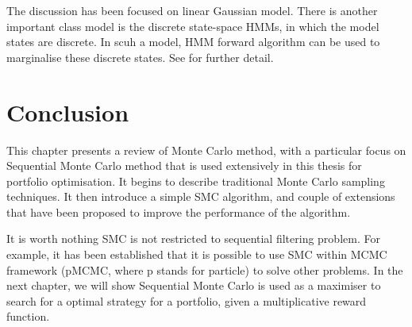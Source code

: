The discussion has been focused on linear Gaussian model. There is another important class model is the discrete state-space HMMs, in which the model states are discrete. In scuh a model, HMM forward algorithm \cite{LRR89} can be used to marginalise these discrete states. See \cite{CO05} for further detail.

\section{Conclusion}
This chapter presents a review of Monte Carlo method, with a particular focus on Sequential Monte Carlo method that is used extensively in this thesis for portfolio optimisation. It begins to describe traditional Monte Carlo sampling techniques. It then introduce a simple SMC algorithm, and couple of extensions that have been proposed to improve the performance of the algorithm.

It is worth nothing SMC is not restricted to sequential filtering problem. For example, it has been established that it is possible to use SMC within MCMC framework (pMCMC, where p stands for particle) \cite{CA10} to solve other problems. In the next chapter, we will show Sequential Monte Carlo is used as a maximiser to search for a optimal strategy for a portfolio, given a multiplicative reward function.








\endinput
\section{Markov chain Monte Carlo (MCMC)}

Markov chain Monte Carlo (MCMC) are a set of algorithms that allows ones to draw random samples from the target probability distribution by constructing a ergotic Markov chain process which has its stationary distribution set to be target desired distribution. 

\subsection{Markov Chain}
Conceptually, Markov chain is a stochastic process in which the past and future states of the process are independent given the current state. A Markov chain can be viewed as an \emph{ordered} sequence of states $\{x_{1:N}\}$, in which state $x_t$ only depends on state $x_{t-1}$, i.e., the state at time $t$ is determined based on some trasition distribution of the form $p(x_t \mid x_{t-1})$, which is independent of all previous states $x_{t-2}, x_{t-3}, \ldots$. 

